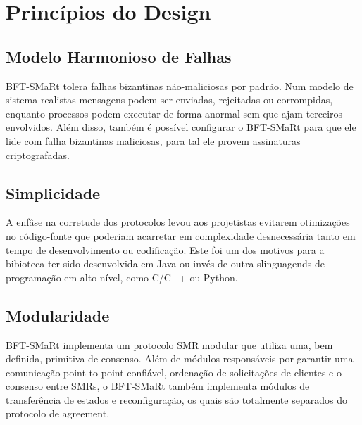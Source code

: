 	\section{Princípios do Design}
	
		\subsection{Modelo Harmonioso de Falhas}
		BFT-SMaRt tolera falhas bizantinas não-maliciosas por padrão. Num modelo de sistema realistas mensagens podem ser enviadas, rejeitadas ou corrompidas, enquanto processos podem executar de forma anormal sem que ajam terceiros envolvidos. Além disso, também é possível configurar o BFT-SMaRt para que ele lide com falha bizantinas maliciosas, para tal ele provem assinaturas criptografadas. \\
		
		\subsection{Simplicidade}
		A enfâse na corretude dos protocolos levou aos projetistas evitarem otimizações no código-fonte que poderiam acarretar em complexidade desnecessária tanto em tempo de desenvolvimento ou codificação. Este foi um dos motivos para a bibioteca ter sido desenvolvida em Java ou invés de outra slinguagends de programação em alto nível, como C/C++ ou Python.\\
		
		\subsection{Modularidade}
		BFT-SMaRt implementa um protocolo SMR modular que utiliza uma, bem definida, primitiva de consenso. Além de módulos responsáveis por garantir uma comunicação point-to-point confiável, ordenação de solicitações de clientes e o consenso entre SMRs, o BFT-SMaRt também implementa módulos de transferência de estados e reconfiguração, os quais são totalmente separados do protocolo de agreement.\\
		
